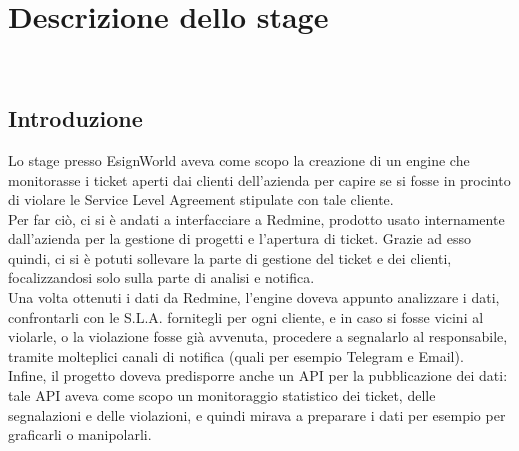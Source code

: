 
\chapter{Descrizione dello stage}
\label{cap:descrizione-stage}

\\

\section{Introduzione}
Lo stage presso EsignWorld aveva come scopo la creazione di un engine che monitorasse i ticket aperti dai clienti dell'azienda per capire se si fosse in procinto di violare le Service Level Agreement stipulate con tale cliente. \\
Per far ciò, ci si è andati a interfacciare a Redmine, prodotto usato internamente dall'azienda per la gestione di progetti e l'apertura di ticket. Grazie ad esso quindi, ci si è potuti sollevare la parte di gestione del ticket e dei clienti, focalizzandosi solo sulla parte di analisi e notifica. \\
Una volta ottenuti i dati da Redmine, l'engine doveva appunto analizzare i dati, confrontarli con le S.L.A. fornitegli per ogni cliente, e in caso si fosse vicini al violarle, o la violazione fosse già avvenuta, procedere a segnalarlo al responsabile, tramite molteplici canali di notifica (quali per esempio Telegram e Email). \\
Infine, il progetto doveva predisporre anche un API per la pubblicazione dei dati: tale API aveva come scopo un monitoraggio statistico dei ticket, delle segnalazioni e delle violazioni, e quindi mirava a preparare i dati per esempio per graficarli o manipolarli.


